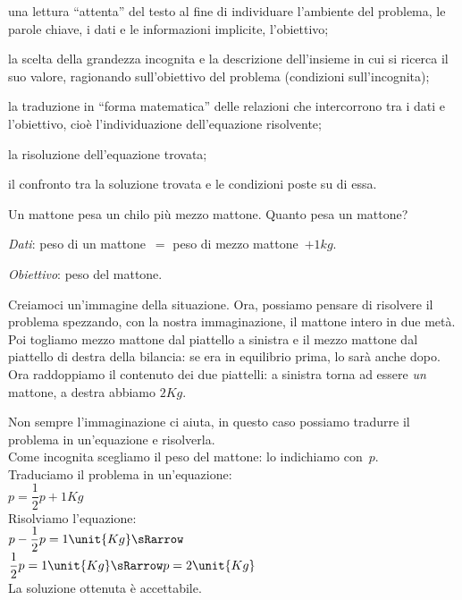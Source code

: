 \begin{enumeratea}
\item una lettura ``attenta'' del
testo al fine di individuare l'ambiente del problema,
le parole chiave, i dati e le informazioni implicite,
l'obiettivo;
\item la scelta della grandezza incognita e la descrizione
dell'insieme in cui si ricerca il suo valore,
ragionando sull'obiettivo del problema (condizioni sull'incognita);
\item la traduzione in ``forma matematica'' delle relazioni che intercorrono 
tra i dati e l'obiettivo, cioè l'individuazione dell'equazione risolvente;
\item la risoluzione dell'equazione trovata;
\item il confronto tra la soluzione trovata e le condizioni poste su di essa.
\end{enumeratea}

\begin{problema}
 Un mattone pesa un chilo più mezzo mattone. Quanto pesa un mattone?
\end{problema}

\emph{Dati}: peso di un mattone~\(=\) peso di mezzo mattone~\(+ 1\unit{kg}.\)

\emph{Obiettivo}: peso del mattone.

\begin{minipage}{.48\textwidth}
\bilanciaa
\end{minipage}
\hfill
\begin{minipage}{.48\textwidth}
Creiamoci un'immagine della situazione.
Ora, possiamo pensare di risolvere il problema spezzando, con la nostra 
immaginazione, il mattone intero in due metà.
Poi togliamo mezzo mattone dal piattello a sinistra e il mezzo mattone dal 
piattello di destra della bilancia:
se era in equilibrio prima, lo sarà anche dopo.\\
Ora raddoppiamo il contenuto dei due piattelli: a sinistra torna ad essere 
\emph{un} mattone, a destra abbiamo \(2\unit{Kg}\).
\end{minipage}

\begin{minipage}{.48\textwidth}
Non sempre l'immaginazione ci aiuta, in questo caso possiamo tradurre il 
problema in un'equazione e risolverla.\\
Come incognita scegliamo il peso del mattone: lo indichiamo con~\(p\).\\
Traduciamo il problema in un'equazione:\\
\(p=\dfrac{1}{2}p+1\unit{Kg}\)\\
Risolviamo l'equazione:\\
\(p-\dfrac{1}{2}p=1\unit{Kg} \sRarrow \)\\
\(\dfrac{1}{2}p=1\unit{Kg} \sRarrow p=2\unit{Kg}\)\\
La soluzione ottenuta è accettabile.
\end{minipage}
\hfill
\begin{minipage}{.48\textwidth}
\bilanciaa
\end{minipage}

